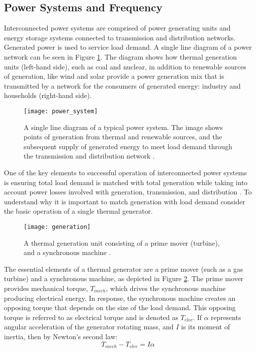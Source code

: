 \subsection{Power Systems and Frequency}
Interconnected power systems are comprised of power generating units and energy storage systems connected to transmission and distribution networks. Generated power is used to service load demand. A single line diagram of a power network can be seen in Figure \ref{fig:generation}. The diagram shows how thermal generation units (left-hand side), such as coal and nuclear, in addition to renewable sources of generation, like wind and solar provide a power generation mix that is transmitted by a network for the consumers of generated energy: industry and households (right-hand side).
\begin{figure}[ht]
	\centering
	\texttt{[image: power\_system]}
	\caption{A single line diagram of a typical power system. The image shows points of generation from thermal and renewable sources, and the subsequent supply of generated energy to meet load demand through the transmission and distribution network \cite{Glavic2019}.}
	\label{fig:generation}
\end{figure}

One of the key elements to successful operation of interconnected power systems is ensuring total load demand is matched with total generation while taking into account power losses involved with generation, transmission, and distribution \cite{Wood2013}. To understand why it is important to match generation with load demand consider the basic operation of a single thermal generator. 
\begin{figure}[h]
	\centering
	\texttt{[image: generation]}
	\caption{A thermal generation unit consisting of a prime mover (turbine), and a synchronous machine \cite{Wood2013}.}
	\label{fig:turbine}
\end{figure}

The essential elements of a thermal generator are a prime mover (such as a gas turbine) and a synchronous machine, as depicted in Figure \ref{fig:turbine}. The prime mover provides mechanical torque, $T_{mech}$, which drives the synchronous machine producing electrical energy. In response, the synchronous machine creates an opposing torque that depends on the size of the load demand. This opposing torque is referred to as electrical torque and is denoted as $T_{elec}$. If $\alpha$ represents angular acceleration of the generator rotating mass, and $I$ is its moment of inertia, then by Newton's second law:
\begin{equation}
	T_{mech} - T_{elec} = I \alpha \label{eq:1}
\end{equation}

